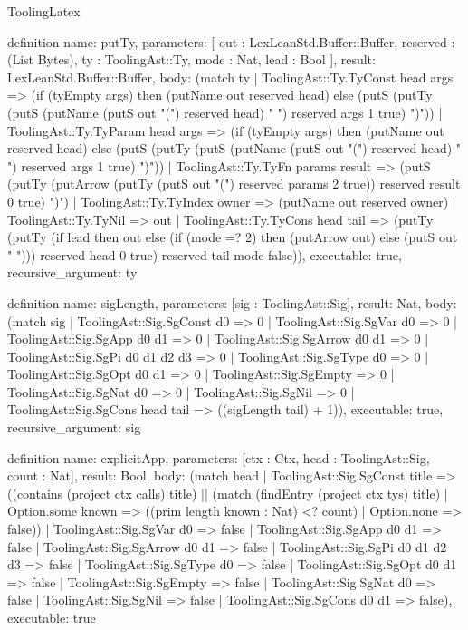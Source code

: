 \begin{lexlean}{ToolingLatex}
\begin{semanticmodule}
definition{
  name: putTy,
  parameters: [
    out : LexLeanStd.Buffer::Buffer,
    reserved : (List Bytes),
    ty : ToolingAst::Ty,
    mode : Nat,
    lead : Bool
  ],
  result: LexLeanStd.Buffer::Buffer,
  body: (match ty
    | ToolingAst::Ty.TyConst head args => (if (tyEmpty args) then (putName out reserved head) else (putS (putTy (putS (putName (putS out "(") reserved head) " ") reserved args 1 true) ")"))
    | ToolingAst::Ty.TyParam head args => (if (tyEmpty args) then (putName out reserved head) else (putS (putTy (putS (putName (putS out "(") reserved head) " ") reserved args 1 true) ")"))
    | ToolingAst::Ty.TyFn params result => (putS (putTy (putArrow (putTy (putS out "(") reserved params 2 true)) reserved result 0 true) ")")
    | ToolingAst::Ty.TyIndex owner => (putName out reserved owner)
    | ToolingAst::Ty.TyNil => out
    | ToolingAst::Ty.TyCons head tail => (putTy (putTy (if lead then out else (if (mode =? 2) then (putArrow out) else (putS out " "))) reserved head 0 true) reserved tail mode false)),
  executable: true,
  recursive_argument: ty
}

definition{
  name: sigLength,
  parameters: [sig : ToolingAst::Sig],
  result: Nat,
  body: (match sig
    | ToolingAst::Sig.SgConst d0 => 0
    | ToolingAst::Sig.SgVar d0 => 0
    | ToolingAst::Sig.SgApp d0 d1 => 0
    | ToolingAst::Sig.SgArrow d0 d1 => 0
    | ToolingAst::Sig.SgPi d0 d1 d2 d3 => 0
    | ToolingAst::Sig.SgType d0 => 0
    | ToolingAst::Sig.SgOpt d0 d1 => 0
    | ToolingAst::Sig.SgEmpty => 0
    | ToolingAst::Sig.SgNat d0 => 0
    | ToolingAst::Sig.SgNil => 0
    | ToolingAst::Sig.SgCons head tail => ((sigLength tail) + 1)),
  executable: true,
  recursive_argument: sig
}

definition{
  name: explicitApp,
  parameters: [ctx : Ctx, head : ToolingAst::Sig, count : Nat],
  result: Bool,
  body: (match head
    | ToolingAst::Sig.SgConst title => ((contains (project ctx calls) title) || (match (findEntry (project ctx tys) title)
      | Option.some known => ((prim length known : Nat) <? count)
      | Option.none => false))
    | ToolingAst::Sig.SgVar d0 => false
    | ToolingAst::Sig.SgApp d0 d1 => false
    | ToolingAst::Sig.SgArrow d0 d1 => false
    | ToolingAst::Sig.SgPi d0 d1 d2 d3 => false
    | ToolingAst::Sig.SgType d0 => false
    | ToolingAst::Sig.SgOpt d0 d1 => false
    | ToolingAst::Sig.SgEmpty => false
    | ToolingAst::Sig.SgNat d0 => false
    | ToolingAst::Sig.SgNil => false
    | ToolingAst::Sig.SgCons d0 d1 => false),
  executable: true
}


\end{semanticmodule}
\end{lexlean}
